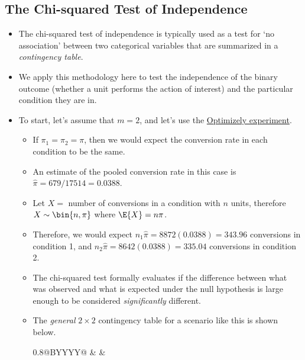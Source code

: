 \subsection{The Chi-squared Test of Independence}
\begin{itemize}
      \item The chi-squared test of independence is typically used as a test for `no association'
            between two categorical variables that are summarized in a \emph{contingency table}.
      \item We apply this methodology here to test the independence of the binary outcome
            (whether a unit performs the action of interest) and the particular condition they are in.
      \item To start, let's assume that $ m=2 $, and let's use the \hyperref[ex:optimizely_ex1]{Optimizely experiment}.
            \begin{itemize}
                  \item If $ \pi_1=\pi_2=\pi $, then we would expect the conversion rate in each condition to be the same.
                  \item An estimate of the pooled conversion rate in this case is $ \hat{\pi}=679/17514=0.0388 $.
                  \item Let $ X= $ number of conversions in a condition with $ n $ units, therefore $ X \sim \bin{n,\pi} $
                        where $ \E{X}=n\pi $.
                  \item Therefore, we would expect $ n_1\hat{\pi}=8872(0.0388)=343.96 $ conversions in condition 1,
                        and $ n_2\hat{\pi}=8642(0.0388)=335.04 $ conversions in condition 2.
                  \item The chi-squared test formally evaluates if the difference between what
                        was observed and what is expected under the null hypothesis is large enough
                        to be considered \emph{significantly} different.
                  \item The \emph{general} $ 2\times 2 $ contingency table for a scenario like this
                        is shown below.
                        \begin{table}[!htbp]
                              \centering
                              \begin{tabularx}{0.8\linewidth}{@{}BYYYY@{}}
                                            &  &                                                                                       \\

\end{tabularx}
\end{table}
\end{itemize}
\end{itemize}
